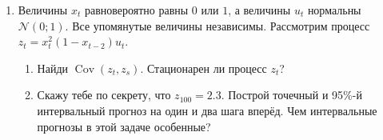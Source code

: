 \documentclass[12pt]{article}
\DeclareMathOperator{\Cov}{Cov}
\def \cN{\mathcal{N}}
\begin{document}
\begin{enumerate}[resume]
\item Величины $x_t$ равновероятно равны $0$ или $1$, 
а величины $u_t$ нормальны $\cN(0; 1)$. Все упомянутые величины независимы.
Рассмотрим процесс $z_t = x_t^2 (1-x_{t-2}) u_t$.

\begin{enumerate}
	\item Найди $\Cov(z_t, z_s)$. Стационарен ли процесс $z_t$?
	\item Скажу тебе по секрету, что $z_{100} = 2.3$. 
	Построй точечный и 95\%-й интервальный прогноз на один и два шага вперёд. 
	Чем интервальные прогнозы в этой задаче особенные?
\end{enumerate}


\end{enumerate}
\end{document}
